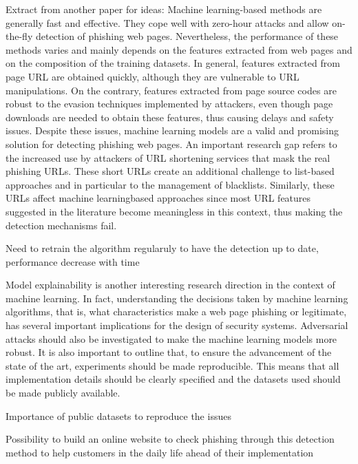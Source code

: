 \documentclass{article}
\begin{document}
    Extract from another paper for ideas:
    Machine learning-based methods are generally fast and
    effective. They cope well with zero-hour attacks and allow
    on-the-fly detection of phishing web pages. Nevertheless, the
    performance of these methods varies and mainly depends on
    the features extracted from web pages and on the composition
    of the training datasets. In general, features extracted from
    page URL are obtained quickly, although they are vulnerable
    to URL manipulations. On the contrary, features extracted
    from page source codes are robust to the evasion techniques
    implemented by attackers, even though page downloads are
    needed to obtain these features, thus causing delays and safety
    issues. Despite these issues, machine learning models are
    a valid and promising solution for detecting phishing web
    pages.
    An important research gap refers to the increased use by
    attackers of URL shortening services that mask the real phishing
    URLs. These short URLs create an additional challenge
    to list-based approaches and in particular to the management
    of blacklists. Similarly, these URLs affect machine learningbased
    approaches since most URL features suggested in the
    literature become meaningless in this context, thus making
    the detection mechanisms fail.

    Need to retrain the algorithm regularuly to have the detection up to date, performance decrease with time

    Model explainability is another interesting research direction
    in the context of machine learning. In fact, understanding
    the decisions taken by machine learning algorithms, that is,
    what characteristics make a web page phishing or legitimate,
    has several important implications for the design of security
    systems. Adversarial attacks should also be investigated to
    make the machine learning models more robust.
    It is also important to outline that, to ensure the advancement
    of the state of the art, experiments should be made reproducible.
    This means that all implementation details should
    be clearly specified and the datasets used should be made
    publicly available.

    Importance of public datasets to reproduce the issues

    Possibility to build an online website to check phishing through this detection method to help customers in the daily life ahead of their implementation
\end{document}
